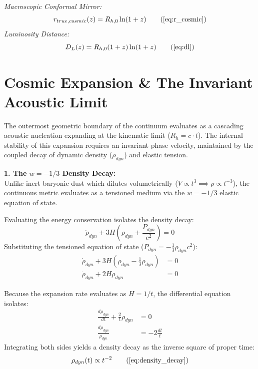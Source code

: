 \begin{tcolorbox}[recallbox, title={\ref{box:optical_dilatation}. Optical Dilatation}] %
\textit{Macroscopic Conformal Mirror:}
\begin{equation}
    r_{true, cosmic}(z) = R_{h,0} \ln(1+z) \tag{\ref{eq:r_cosmic}}
\end{equation}
\textit{Luminosity Distance:}
\begin{equation}
    D_L(z) = R_{h,0} (1+z) \ln(1+z) \tag{\ref{eq:dl}}
\end{equation}
\end{tcolorbox}




\section{Cosmic Expansion \& The Invariant Acoustic Limit}
\label{sec:deriv_acoustic_invariance}

The outermost geometric boundary of the continuum evaluates as a cascading acoustic nucleation expanding at the kinematic limit ($R_h = c \cdot t$). The internal stability of this expansion requires an invariant phase velocity, maintained by the coupled decay of dynamic density ($\rho_{dyn}$) and elastic tension. 

\textbf{1. The $w = -1/3$ Density Decay:} \\
Unlike inert baryonic dust which dilutes volumetrically ($V \propto t^3 \implies \rho \propto t^{-3}$), the continuous metric evaluates as a tensioned medium via the $w = -1/3$ elastic equation of state. 

Evaluating the energy conservation isolates the density decay: 
\begin{equation}
    \dot{\rho}_{dyn} + 3H\left(\rho_{dyn} + \frac{P_{dyn}}{c^2}\right) = 0 
\end{equation}
Substituting the tensioned equation of state ($P_{dyn} = -\frac{1}{3}\rho_{dyn} c^2$):
\begin{align}
    \dot{\rho}_{dyn} + 3H\left(\rho_{dyn} - \frac{1}{3}\rho_{dyn}\right) &= 0  \\
    \dot{\rho}_{dyn} + 2H\rho_{dyn} &= 0 
\end{align}

Because the expansion rate evaluates as $H = 1/t$, the differential equation isolates:
\begin{align}
    \frac{d\rho_{dyn}}{dt} + \frac{2}{t}\rho_{dyn} &= 0  \\
    \frac{d\rho_{dyn}}{\rho_{dyn}} &= -2 \frac{dt}{t} 
\end{align}
Integrating both sides yields a density decay as the inverse square of proper time: 
\begin{equation}
    \rho_{dyn}(t) \propto t^{-2} \tag{\ref{eq:density_decay}} %
\end{equation}

